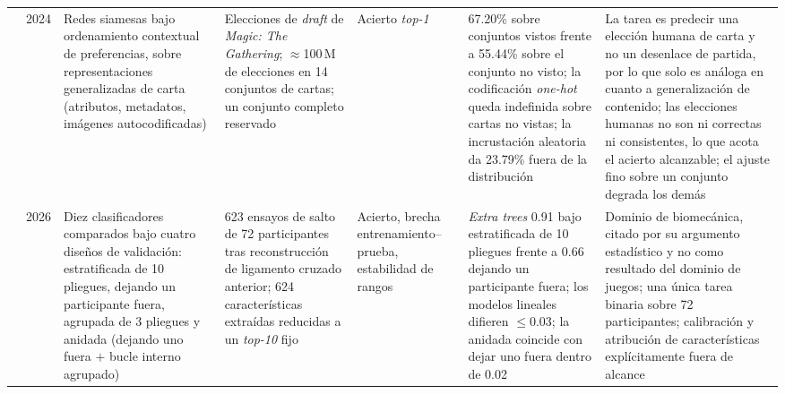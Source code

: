 \documentclass[conference]{IEEEtran}
\begin{document}
\begin{table}[!tp]
\begin{tabularx}{\textwidth}{@{}l c P{2.05cm} P{2.35cm} P{1.5cm} P{2.35cm} Y@{}}
\cite{bertram_cardrepresentations_2024} & 2024 &
Redes siamesas bajo ordenamiento contextual de preferencias, sobre
representaciones generalizadas de carta (atributos, metadatos, im\'agenes
autocodificadas) &
Elecciones de \emph{draft} de \emph{Magic: The Gathering};
$\approx$100\,M de elecciones en 14 conjuntos de cartas; un conjunto
completo reservado &
Acierto \emph{top-1} &
67.20\% sobre conjuntos vistos frente a 55.44\% sobre el conjunto no
visto; la codificaci\'on \emph{one-hot} queda indefinida sobre cartas no
vistas; la incrustaci\'on aleatoria da 23.79\% fuera de la distribuci\'on &
La tarea es predecir una elecci\'on humana de carta y no un desenlace de
partida, por lo que solo es an\'aloga en cuanto a generalizaci\'on de
contenido; las elecciones humanas no son ni correctas ni consistentes, lo
que acota el acierto alcanzable; el ajuste fino sobre un conjunto degrada
los dem\'as\\
\addlinespace

\cite{karbalaie_participantaware_2026} & 2026 &
Diez clasificadores comparados bajo cuatro dise\~nos de validaci\'on:
estratificada de 10 pliegues, dejando un participante fuera, agrupada de 3
pliegues y anidada (dejando uno fuera $+$ bucle interno agrupado) &
623 ensayos de salto de 72 participantes tras reconstrucci\'on de ligamento
cruzado anterior; 624 caracter\'isticas extra\'idas reducidas a un
\emph{top-10} fijo &
Acierto, brecha entrenamiento--prueba, estabilidad de rangos &
\emph{Extra trees} 0.91 bajo estratificada de 10 pliegues frente a 0.66
dejando un participante fuera; los modelos lineales difieren $\leq$0.03; la
anidada coincide con dejar uno fuera dentro de 0.02 &
Dominio de biomec\'anica, citado por su argumento estad\'istico y no como
resultado del dominio de juegos; una \'unica tarea binaria sobre 72
participantes; calibraci\'on y atribuci\'on de caracter\'isticas
expl\'icitamente fuera de alcance\\

\bottomrule
\end{tabularx}
\end{table}


\end{document}
